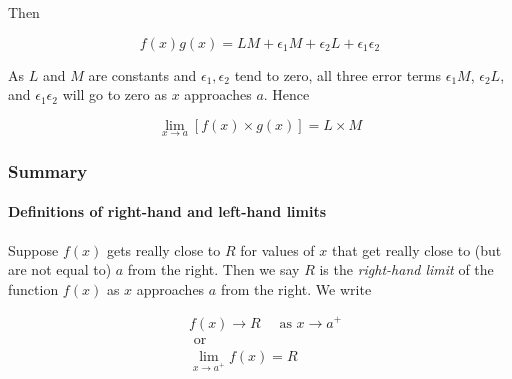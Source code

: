 \documentclass[pdftex, brazil, 12pt, twoside]{article}
\begin{document}
Then

\begin{equation}
  f(x)g(x) = LM + \epsilon_1M + \epsilon_2L + \epsilon_1\epsilon_2
\end{equation}

As $L$ and $M$ are constants and $\epsilon_1,\epsilon_2$ tend to zero, all three error terms
$\epsilon_1M$, $\epsilon_2L$, and $\epsilon_1\epsilon_2$ will go to zero as $x$
approaches $a$. Hence

\begin{equation}
  \lim_{x \to a}\left[f(x) \times g(x)\right] = L \times M
\end{equation}

\subsubsection{Summary}
\label{u0-intro-summary}

\begin{figure}[H]
  \begin{center}
  \end{center}
\end{figure}

\paragraph{Definitions of right-hand and left-hand limits}  Suppose $f(x)$ gets
really close to $R$ for values of $x$ that get really close to (but are not equal
to) $a$ from the right. Then we say $R$ is the \emph{right-hand limit} of the function
$f(x)$ as $x$ approaches $a$ from the right. We write

\begin{equation}
  \begin{split}
    &f(x) \to R \quad \text{ as } x \to a^+\\
    &\text{ or }\\
    &\lim_{x \to a^+}f(x) = R
  \end{split}
\end{equation}
\end{document}
